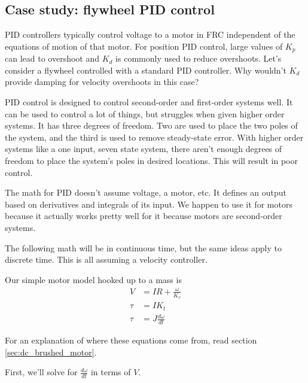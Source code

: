 \subsection{Case study: flywheel PID control}

PID controllers typically control voltage to a motor in FRC independent of the
equations of motion of that motor. For position PID control, large values of
$K_p$ can lead to overshoot and $K_d$ is commonly used to reduce overshoots.
Let's consider a flywheel controlled with a standard PID controller. Why
wouldn't $K_d$ provide damping for velocity overshoots in this case?

PID control is designed to control second-order and first-order \glspl{system}
well. It can be used to control a lot of things, but struggles when given higher
order \glspl{system}. It has three degrees of freedom. Two are used to place the
two poles of the \gls{system}, and the third is used to remove steady-state
error. With higher order \glspl{system} like a one input, seven \gls{state}
\gls{system}, there aren't enough degrees of freedom to place the \gls{system}'s
poles in desired locations. This will result in poor control.

The math for PID doesn't assume voltage, a motor, etc. It defines an output
based on derivatives and integrals of its input. We happen to use it for motors
because it actually works pretty well for it because motors are second-order
\glspl{system}.

The following math will be in continuous time, but the same ideas apply to
discrete time. This is all assuming a velocity controller.

Our simple motor model hooked up to a mass is
\begin{align}
  V &= IR + \frac{\omega}{K_v}
    \label{eq:steady-state_error_classical_flywheel_1} \\
  \tau &= I K_t \label{eq:steady-state_error_classical_flywheel_2} \\
  \tau &= J \frac{d\omega}{dt}
    \label{eq:steady-state_error_classical_flywheel_3}
\end{align}

For an explanation of where these equations come from, read section
\ref{sec:dc_brushed_motor}.

First, we'll solve for $\frac{d\omega}{dt}$ in terms of $V$.

